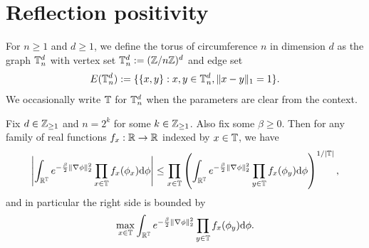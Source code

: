 


\section{Reflection positivity}

\begin{definition}[Torus]
    \label{def:torus}
    For $n\geq 1$ and $d\geq 1$, we define the torus of circumference $n$ in dimension
    $d$ as the graph $\mathbb T_n^d$ with vertex set
    \(
        \mathbb T_n^d := (\mathbb Z/n\mathbb Z)^d
    \)
    and edge set
    \[
        E(\mathbb T_n^d) := \{\{x,y\} : x,y\in \mathbb T_n^d, \|x-y\|_1 = 1\}.
    \]
    We occasionally write $\mathbb T$ for $\mathbb T_n^d$ when the parameters are clear from the context.
\end{definition}


\begin{theorem}
    \label{thm:chessboard}
    Fix $d\in\mathbb Z_{\geq 1}$ and $n=2^k$ for some $k\in\mathbb Z_{\geq 1}$.
    Also fix some $\beta\geq 0$.
    Then for any family of real functions $f_x:\mathbb R\to\mathbb R$ indexed by $x\in \mathbb T$, we have
    \[
        \left|\int_{\mathbb R^\mathbb T}
        e^{-\frac\beta2 \|\nabla\phi\|_2^2} \prod_{x\in \mathbb T} f_x(\phi_x) {\mathrm{d}}\phi\right|
        \leq
        \prod_{x\in \mathbb T}\left( \int_{\mathbb R^\mathbb T}
        e^{-\frac\beta2 \|\nabla\phi\|_2^2} \prod_{y\in \mathbb T} f_x(\phi_y) {\mathrm{d}}\phi\right)^{1/|\mathbb T|},
    \]
    and in particular the right side is bounded by
    \[
        \max_{x\in \mathbb T}
        \int_{\mathbb R^\mathbb T}
        e^{-\frac\beta2 \|\nabla\phi\|_2^2} \prod_{y\in \mathbb T} f_x(\phi_y) {\mathrm{d}}\phi.
    \]
\end{theorem}

